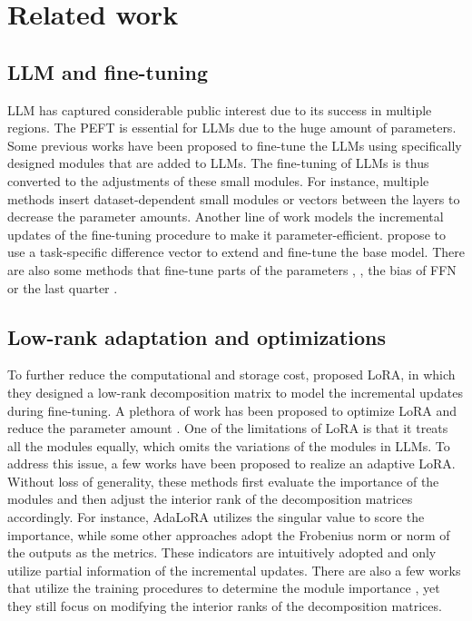 \section{Related work}
\label{sec: related work}

\subsection{LLM and fine-tuning}
LLM has captured considerable public interest due to its success in multiple regions. The PEFT is essential for LLMs due to the huge amount of parameters.  
Some previous works have been proposed to fine-tune the LLMs using specifically designed modules that are added to LLMs. The fine-tuning of LLMs is thus converted to the adjustments of these small modules. For instance, multiple methods  \cite{rebuffi2018efficient, liu2022ptuning, lester2021power} insert dataset-dependent small modules or vectors between the layers to decrease the parameter amounts. 
%
Another line of work models the incremental updates of the fine-tuning procedure to make it parameter-efficient. \citet{guo2021parameter} propose to use a task-specific difference vector to extend and fine-tune the base model. There are also some methods that fine-tune parts of 
the parameters \cite{gui2023hifi}, \eg, the bias of FFN \cite{zaken2022bitfit} or the last quarter \cite{lee2019would}. 

\subsection{Low-rank adaptation and optimizations}

To further reduce the computational and storage cost, \citet{hu2022lora} proposed LoRA, in which they designed a low-rank decomposition matrix to model the incremental updates during fine-tuning. 
%
A plethora of work has been proposed to optimize LoRA and reduce the parameter amount \cite{kopiczko2024vera, hayou2024, liu2024dora, dettmers2024qlora, renduchintala2024tied}. One of the limitations of LoRA is that it treats all the modules equally, which omits the variations of the modules in LLMs. 
To address this issue, a few works have been proposed to realize an adaptive LoRA.
Without loss of generality, these methods first evaluate the importance of the modules and then adjust the interior rank of the decomposition matrices accordingly.
For instance, AdaLoRA \cite{zhang2023adaptive} utilizes the singular value to score the importance, while some other approaches adopt the Frobenius norm \cite{mao2024doraadaptive} or norm of the outputs \cite{zhou2024loradrop} as the metrics. 
These indicators are intuitively adopted and only utilize partial information of the incremental updates. 
There are also a few works that utilize the training procedures to determine the module importance \cite{ding2023sparse, zhang2024autolora, liu2024alora}, yet they still focus on modifying the interior ranks of the decomposition matrices. 

